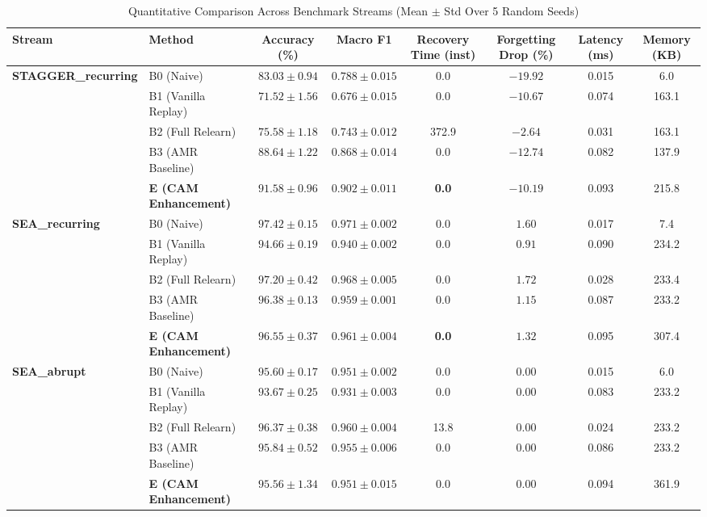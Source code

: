 \documentclass[conference]{IEEEtran}
\begin{document}
\begin{table}[t]
\centering
\caption{Quantitative Comparison Across Benchmark Streams (Mean $\pm$ Std Over 5 Random Seeds)}
\label{tab:main_results}
\begin{tabular}{llcccccc}
\toprule
\textbf{Stream} & \textbf{Method} & \textbf{Accuracy (\%)} & \textbf{Macro F1} & \textbf{Recovery Time (inst)} & \textbf{Forgetting Drop (\%)} & \textbf{Latency (ms)} & \textbf{Memory (KB)} \\
\midrule
\multirow{5}{*}{\textbf{STAGGER\_recurring}} 
& B0 (Naive) & $83.03 \pm 0.94$ & $0.788 \pm 0.015$ & 0.0 & $-19.92$ & 0.015 & 6.0 \\
& B1 (Vanilla Replay) & $71.52 \pm 1.56$ & $0.676 \pm 0.015$ & 0.0 & $-10.67$ & 0.074 & 163.1 \\
& B2 (Full Relearn) & $75.58 \pm 1.18$ & $0.743 \pm 0.012$ & 372.9 & $-2.64$ & 0.031 & 163.1 \\
& B3 (AMR Baseline) & $88.64 \pm 1.22$ & $0.868 \pm 0.014$ & 0.0 & $-12.74$ & 0.082 & 137.9 \\
& \textbf{E (CAM Enhancement)} & $\mathbf{91.58 \pm 0.96}$ & $\mathbf{0.902 \pm 0.011}$ & \textbf{0.0} & $\mathbf{-10.19}$ & 0.093 & 215.8 \\
\midrule
\multirow{5}{*}{\textbf{SEA\_recurring}} 
& B0 (Naive) & $97.42 \pm 0.15$ & $0.971 \pm 0.002$ & 0.0 & $1.60$ & 0.017 & 7.4 \\
& B1 (Vanilla Replay) & $94.66 \pm 0.19$ & $0.940 \pm 0.002$ & 0.0 & $0.91$ & 0.090 & 234.2 \\
& B2 (Full Relearn) & $97.20 \pm 0.42$ & $0.968 \pm 0.005$ & 0.0 & $1.72$ & 0.028 & 233.4 \\
& B3 (AMR Baseline) & $96.38 \pm 0.13$ & $0.959 \pm 0.001$ & 0.0 & $1.15$ & 0.087 & 233.2 \\
& \textbf{E (CAM Enhancement)} & $\mathbf{96.55 \pm 0.37}$ & $\mathbf{0.961 \pm 0.004}$ & \textbf{0.0} & $1.32$ & 0.095 & 307.4 \\
\midrule
\multirow{5}{*}{\textbf{SEA\_abrupt}} 
& B0 (Naive) & $95.60 \pm 0.17$ & $0.951 \pm 0.002$ & 0.0 & 0.00 & 0.015 & 6.0 \\
& B1 (Vanilla Replay) & $93.67 \pm 0.25$ & $0.931 \pm 0.003$ & 0.0 & 0.00 & 0.083 & 233.2 \\
& B2 (Full Relearn) & $96.37 \pm 0.38$ & $0.960 \pm 0.004$ & 13.8 & 0.00 & 0.024 & 233.2 \\
& B3 (AMR Baseline) & $95.84 \pm 0.52$ & $0.955 \pm 0.006$ & 0.0 & 0.00 & 0.086 & 233.2 \\
& \textbf{E (CAM Enhancement)} & $95.56 \pm 1.34$ & $0.951 \pm 0.015$ & 0.0 & 0.00 & 0.094 & 361.9 \\

\end{tabular}
\end{table}
\end{document}
